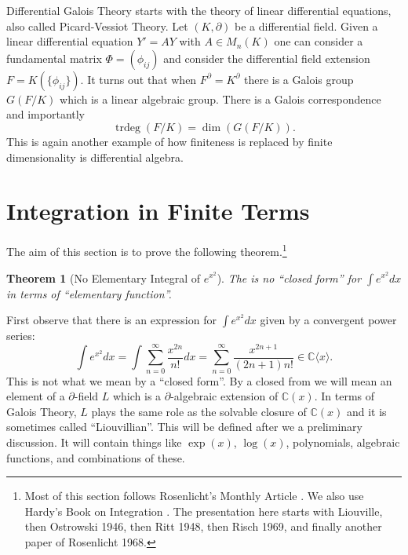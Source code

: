 \documentclass[12pt]{book}
\numberwithin{equation}{section}
\newtheorem{theorem}{Theorem}[subsection]
\theoremstyle{definition}
\theoremstyle{remark}
\newcommand{\trdeg}{\operatorname{trdeg}}
\newcommand{\CC}{\mathbb{C}}
\begin{document}
Differential Galois Theory starts with the theory of linear differential equations, also called Picard-Vessiot Theory.
Let $(K,\partial)$ be a differential field. 
Given a linear differential equation $Y'=AY$ with $A\in M_n(K)$ one can consider a fundamental matrix $\Phi= (\phi_{ij})$ and consider the differential field extension $F = K(\lbrace \phi_{ij}\rbrace)$. 
It turns out that when $F^{\partial}=K^{\partial}$ there is a Galois group $G(F/K)$ which is a linear algebraic group.
There is a Galois correspondence and importantly 
 $$ \trdeg(F/K) = \dim( G(F/K) ).$$
This is again another example of how finiteness is replaced by finite dimensionality is differential algebra.


\section{Integration in Finite Terms}

The aim of this section is to prove the following theorem.\footnote{Most of this section follows Rosenlicht's Monthly Article \cite{Rosenlicht1972}. 
We also use Hardy's Book on Integration \cite{Hardy1979}.
The presentation here starts with Liouville, then Ostrowski 1946, then Ritt 1948, then Risch 1969, and finally another paper of Rosenlicht 1968. 
}
\begin{theorem}[No Elementary Integral of $e^{x^2}$]
The is no ``closed form'' for $\int e^{x^2}dx$ in terms of ``elementary function''. 
\end{theorem} 
First observe that there is an expression for $\int e^{x^2}dx$ given by a convergent power series:
$$ \int e^{x^2}dx = \int \sum_{n=0}^{\infty} \frac{x^{2n}}{n!} dx = \sum_{n=0}^{\infty} \frac{x^{2n+1}}{(2n+1)n!} \in \CC\langle x\rangle.$$
This is not what we mean by a ``closed form''. 
By a closed from we will mean an element of a $\partial$-field $L$ which is a $\partial$-algebraic extension of $\CC(x)$. 
In terms of Galois Theory, $L$ plays the same role as the solvable closure of $\CC(x)$ and it is sometimes called ``Liouvillian''. 
This will be defined after we a preliminary discussion.
It will contain things like $\exp(x)$, $\log(x)$, polynomials, algebraic functions, and combinations of these. 
\end{document}
